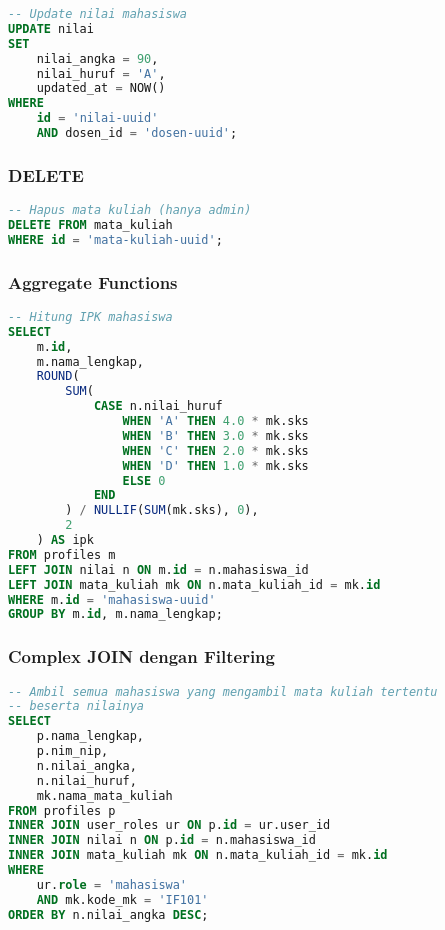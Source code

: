 \documentclass[12pt,a4paper]{article}
\begin{document}
\begin{lstlisting}[language=SQL]
-- Update nilai mahasiswa
UPDATE nilai
SET 
    nilai_angka = 90,
    nilai_huruf = 'A',
    updated_at = NOW()
WHERE 
    id = 'nilai-uuid'
    AND dosen_id = 'dosen-uuid';
\end{lstlisting}

\subsubsection{DELETE}

\begin{lstlisting}[language=SQL]
-- Hapus mata kuliah (hanya admin)
DELETE FROM mata_kuliah
WHERE id = 'mata-kuliah-uuid';
\end{lstlisting}

\subsubsection{Aggregate Functions}

\begin{lstlisting}[language=SQL]
-- Hitung IPK mahasiswa
SELECT 
    m.id,
    m.nama_lengkap,
    ROUND(
        SUM(
            CASE n.nilai_huruf
                WHEN 'A' THEN 4.0 * mk.sks
                WHEN 'B' THEN 3.0 * mk.sks
                WHEN 'C' THEN 2.0 * mk.sks
                WHEN 'D' THEN 1.0 * mk.sks
                ELSE 0
            END
        ) / NULLIF(SUM(mk.sks), 0),
        2
    ) AS ipk
FROM profiles m
LEFT JOIN nilai n ON m.id = n.mahasiswa_id
LEFT JOIN mata_kuliah mk ON n.mata_kuliah_id = mk.id
WHERE m.id = 'mahasiswa-uuid'
GROUP BY m.id, m.nama_lengkap;
\end{lstlisting}

\subsubsection{Complex JOIN dengan Filtering}

\begin{lstlisting}[language=SQL]
-- Ambil semua mahasiswa yang mengambil mata kuliah tertentu
-- beserta nilainya
SELECT 
    p.nama_lengkap,
    p.nim_nip,
    n.nilai_angka,
    n.nilai_huruf,
    mk.nama_mata_kuliah
FROM profiles p
INNER JOIN user_roles ur ON p.id = ur.user_id
INNER JOIN nilai n ON p.id = n.mahasiswa_id
INNER JOIN mata_kuliah mk ON n.mata_kuliah_id = mk.id
WHERE 
    ur.role = 'mahasiswa'
    AND mk.kode_mk = 'IF101'
ORDER BY n.nilai_angka DESC;
\end{lstlisting}
\end{document}
